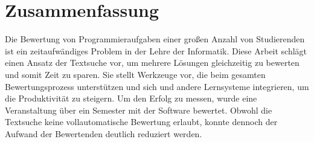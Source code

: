 \chapter*{Zusammenfassung}


Die Bewertung von Programmieraufgaben einer großen Anzahl von Studierenden ist ein zeitaufwändiges Problem in der Lehre der Informatik.
Diese Arbeit schlägt einen Ansatz der Textsuche vor, um mehrere Lösungen gleichzeitig zu bewerten und somit Zeit zu sparen.
Sie stellt Werkzeuge vor, die beim gesamten Bewertungsprozess unterstützen und sich und andere Lernsysteme integrieren, um die Produktivität zu steigern.
Um den Erfolg zu messen, wurde eine Veranstaltung über ein Semester mit der Software bewertet.
Obwohl die Textsuche keine vollautomatische Bewertung erlaubt, konnte dennoch der Aufwand der Bewertenden deutlich reduziert werden.
